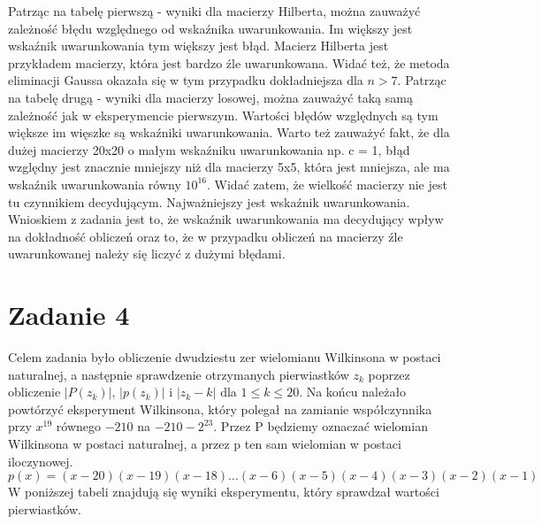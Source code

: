 \documentclass[]{article}
\begin{document}
	Patrząc na tabelę pierwszą - wyniki dla macierzy Hilberta, można zauważyć zależność błędu względnego od wskaźnika uwarunkowania. Im większy jest wskaźnik uwarunkowania tym większy jest błąd. Macierz Hilberta jest przykładem macierzy, która jest bardzo źle uwarunkowana. Widać też, że metoda eliminacji Gaussa okazała się w tym przypadku dokładniejsza dla $n>7$. \newline
	Patrząc na tabelę drugą - wyniki dla macierzy losowej, można zauważyć taką samą zależność jak w eksperymencie pierwszym. Wartości błędów względnych są tym większe im więszke są wskaźniki uwarunkowania. Warto też zauważyć fakt, że dla dużej macierzy 20x20 o małym wskaźniku uwarunkowania np. c = 1, błąd względny jest znacznie mniejszy niż dla macierzy 5x5, która jest mniejsza, ale ma wskaźnik uwarunkowania równy $10^{16}$. Widać zatem, że wielkość macierzy nie jest tu czynnikiem decydującym. Najważniejszy jest wskaźnik uwarunkowania. Wnioskiem z zadania jest to, że wskaźnik uwarunkowania ma decydujący wpływ na dokładność obliczeń oraz to, że w przypadku obliczeń na macierzy źle uwarunkowanej należy się liczyć z dużymi błędami.
	
	\section*{Zadanie 4}

	Celem zadania było obliczenie dwudziestu zer wielomianu Wilkinsona w postaci naturalnej, a następnie sprawdzenie otrzymanych pierwiastków $z_k$ poprzez obliczenie $|P(z_k)|$, $|p(z_k)|$ i $|z_k-k|$ dla $1\leq k\leq 20$. Na końcu należało powtórzyć eksperyment Wilkinsona, który polegał na zamianie współczynnika przy $x^{19}$ równego $-210$ na $-210 -2^{23}$. Przez P będziemy oznaczać wielomian Wilkinsona w postaci naturalnej, a przez
	p ten sam wielomian w postaci iloczynowej.	
	$$p(x) = (x-20)(x-19)(x-18)\dots(x-6)(x-5)(x-4)(x-3)(x-2)(x-1)$$
	W poniższej tabeli znajdują się wyniki eksperymentu, który sprawdzał wartości pierwiastków.
	
\end{document}
